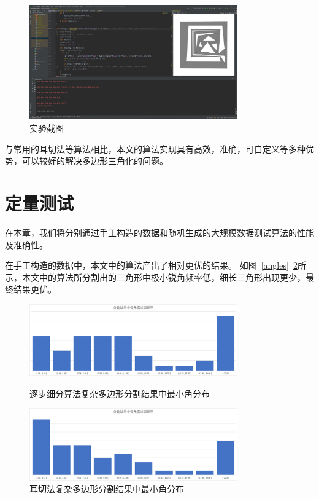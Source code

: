 \begin{figure}[htp]
    \centering
    \includegraphics[width=0.8\textwidth]
    {figures/output.png}
    \caption{实验截图}
    \label{test}
  \end{figure}


与常用的耳切法等算法相比，本文的算法实现具有高效，准确，可自定义等多种优势，可以较好的解决多边形三角化的问题。

\section{定量测试}

在本章，我们将分别通过手工构造的数据和随机生成的大规模数据测试算法的性能及准确性。

在手工构造的数据中，本文中的算法产出了相对更优的结果。
如图~\ref{angles}~\ref{earcut}所示，本文中的算法所分割出的三角形中极小锐角频率低，细长三角形出现更少，最终结果更优。


\begin{figure}[htp]
    \centering
    \includegraphics[width=0.8\textwidth]
    {figures/angles.png}
    \caption{逐步细分算法复杂多边形分割结果中最小角分布}
    \label{angles}
    \centering
    \includegraphics[width=0.8\textwidth]
    {figures/earcut.png}
    \caption{耳切法复杂多边形分割结果中最小角分布}
    \label{earcut}
  \end{figure}

